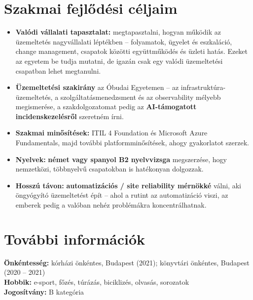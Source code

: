 \documentclass[a4paper,11pt]{article}
\newcommand{\resumeItem}[1]{\item\small{#1\vspace{-2pt}}}
\begin{document}
\section{Szakmai fejlődési céljaim}
  \begin{itemize}[leftmargin=0.3in, itemsep=1pt]
    \resumeItem{\textbf{Valódi vállalati tapasztalat:} megtapasztalni, hogyan működik az üzemeltetés nagyvállalati
      léptékben -- folyamatok, ügyelet és eszkaláció, change management, csapatok közötti együttműködés és üzleti hatás.
      Ezeket az egyetem be tudja mutatni, de igazán csak egy valódi üzemeltetési csapatban lehet megtanulni.}
    \resumeItem{\textbf{Üzemeltetési szakirány} az Óbudai Egyetemen -- az infrastruktúra-üzemeltetés, a
      szolgáltatásmenedzsment és az observability mélyebb megismerése, a szakdolgozatomat pedig az
      \textbf{AI-támogatott incidenskezelésről} szeretném írni.}
    \resumeItem{\textbf{Szakmai minősítések:} ITIL 4 Foundation és Microsoft Azure Fundamentals, majd további
      platformminősítések, ahogy gyakorlatot szerzek.}
    \resumeItem{\textbf{Nyelvek:} \textbf{német vagy spanyol B2 nyelvvizsga} megszerzése, hogy nemzetközi, többnyelvű
      csapatokban is hatékonyan dolgozzak.}
    \resumeItem{\textbf{Hosszú távon:} \textbf{automatizációs / site reliability mérnökké} válni, aki öngyógyító
      üzemeltetést épít -- ahol a rutint az automatizáció viszi, az emberek pedig a valóban nehéz problémákra
      koncentrálhatnak.}
  \end{itemize}
  \vspace{-4pt}

\section{További információk}
 \begin{itemize}[leftmargin=0.15in, label={}]
    \small{\item{
     \textbf{Önkéntesség:} kórházi önkéntes, Budapest (2021); könyvtári önkéntes, Budapest (2020 -- 2021) \\
     \textbf{Hobbik:} e-sport, főzés, túrázás, biciklizés, olvasás, sorozatok \\
     \textbf{Jogosítvány:} B kategória
    }}
 \end{itemize}
\end{document}
